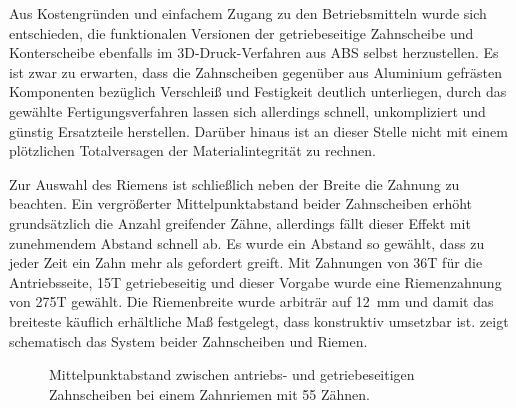 		Aus Kostengründen und einfachem Zugang zu den Betriebsmitteln wurde sich entschieden, die funktionalen Versionen der getriebeseitige Zahnscheibe und Konterscheibe ebenfalls im 3D-Druck-Verfahren aus ABS selbst herzustellen.
		Es ist zwar zu erwarten, dass die Zahnscheiben gegenüber aus Aluminium gefrästen Komponenten bezüglich Verschleiß und Festigkeit deutlich unterliegen, durch das gewählte Fertigungsverfahren lassen sich allerdings schnell, unkompliziert und günstig Ersatzteile herstellen.
		Darüber hinaus ist an dieser Stelle nicht mit einem plötzlichen Totalversagen der Materialintegrität zu rechnen.\par\medskip
		Zur Auswahl des Riemens ist schließlich neben der Breite die Zahnung zu beachten.
		Ein vergrößerter Mittelpunktabstand beider Zahnscheiben erhöht grundsätzlich die Anzahl greifender Zähne, allerdings fällt dieser Effekt mit zunehmendem Abstand schnell ab.
		Es wurde ein Abstand so gewählt, dass zu jeder Zeit ein Zahn mehr als gefordert greift.
		Mit Zahnungen von 36T für die Antriebsseite, 15T getriebeseitig und dieser Vorgabe wurde eine Riemenzahnung von 275T gewählt.
		Die Riemenbreite wurde arbiträr auf \qty{12}{\milli\metre} und damit das breiteste käuflich erhältliche Maß festgelegt, dass konstruktiv umsetzbar ist.
		 zeigt schematisch das System beider Zahnscheiben und Riemen.
		\begin{figure}[h]
			\centering
			
			\caption[Mittelpunktabstand zwischen antriebs- und getriebeseitigen Zahnscheiben]{Mittelpunktabstand zwischen antriebs- und getriebeseitigen Zahnscheiben bei einem Zahnriemen mit 55 Zähnen.}
			\label{fig:timing belt length}
		\end{figure}
